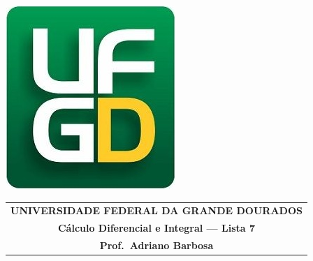 \documentclass[a4paper,5pt]{amsbook}
\begin{document}
\thispagestyle{empty}
\pagestyle{empty}
\begin{minipage}[h]{0.14\textwidth}
	\includegraphics[scale=0.24]{../ufgd.png}
\end{minipage}
\begin{minipage}[h]{\textwidth}
\begin{tabular}{c}
{{\bf UNIVERSIDADE FEDERAL DA GRANDE DOURADOS}}\\
{{\bf C\'alculo Diferencial e Integral --- Lista 7}}\\
{{\bf Prof.\ Adriano Barbosa}}\\
\end{tabular}
\vspace{-0.45cm}
%
\end{minipage}

\end{document}
